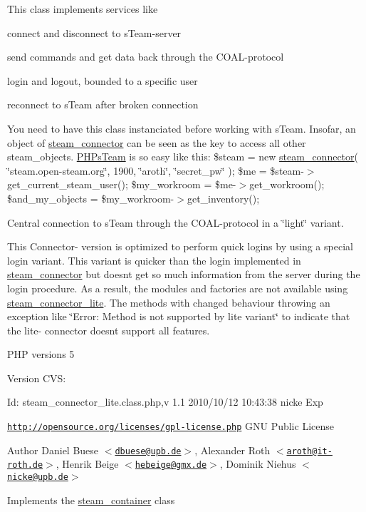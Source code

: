 This class implements services like
\begin{DoxyItemize}
\item connect and disconnect to sTeam-\/server
\item send commands and get data back through the COAL-\/protocol
\item login and logout, bounded to a specific user
\item reconnect to sTeam after broken connection
\end{DoxyItemize}

You need to have this class instanciated before working with sTeam. Insofar, an object of \hyperlink{classsteam__connector}{steam\_\-connector} can be seen as the key to access all other steam\_\-objects. \hyperlink{namespace_p_h_ps_team}{PHPsTeam} is so easy like this: {\ttfamily  \$steam = new \hyperlink{classsteam__connector}{steam\_\-connector}( \char`\"{}steam.open-\/steam.org\char`\"{}, 1900, \char`\"{}aroth\char`\"{}, \char`\"{}secret\_\-pw\char`\"{} ); \$me = \$steam-\/$>$get\_\-current\_\-steam\_\-user(); \$my\_\-workroom = \$me-\/$>$get\_\-workroom(); \$and\_\-my\_\-objects = \$my\_\-workroom-\/$>$get\_\-inventory(); }

Central connection to sTeam through the COAL-\/protocol in a \char`\"{}light\char`\"{} variant.

This Connector-\/ version is optimized to perform quick logins by using a special login variant. This variant is quicker than the login implemented in \hyperlink{classsteam__connector}{steam\_\-connector} but doesnt get so much information from the server during the login procedure. As a result, the modules and factories are not available using \hyperlink{classsteam__connector__lite}{steam\_\-connector\_\-lite}. The methods with changed behaviour throwing an exception like \char`\"{}Error: Method
 is not supported by lite variant\char`\"{} to indicate that the lite-\/ connector doesnt support all features.

PHP versions 5

\begin{DoxyVersion}{Version}
CVS: 
\end{DoxyVersion}
\begin{DoxyParagraph}{Id:}
steam\_\-connector\_\-lite.class.php,v 1.1 2010/10/12 10:43:38 nicke Exp 
\end{DoxyParagraph}


\href{http://opensource.org/licenses/gpl-license.php}{\tt http://opensource.org/licenses/gpl-\/license.php} GNU Public License \begin{DoxyAuthor}{Author}
Daniel Buese $<$\href{mailto:dbuese@upb.de}{\tt dbuese@upb.de}$>$, Alexander Roth $<$\href{mailto:aroth@it-roth.de}{\tt aroth@it-\/roth.de}$>$, Henrik Beige $<$\href{mailto:hebeige@gmx.de}{\tt hebeige@gmx.de}$>$, Dominik Niehus $<$\href{mailto:nicke@upb.de}{\tt nicke@upb.de}$>$
\end{DoxyAuthor}
Implements the \hyperlink{classsteam__container}{steam\_\-container} class

